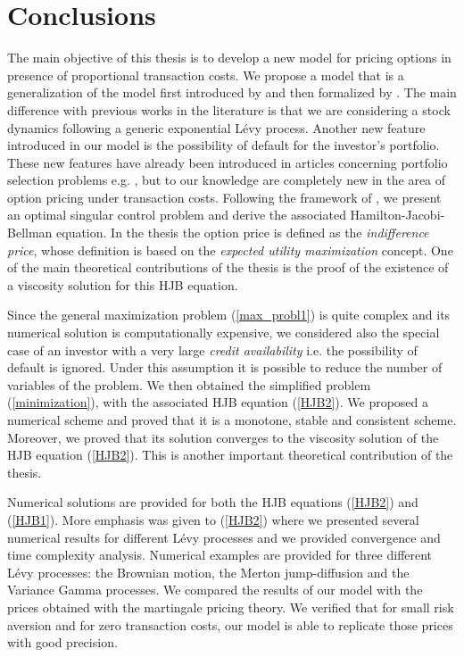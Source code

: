 
\chapter{Conclusions}\label{Conclusions}


\vspace{5em}




The main objective of this thesis is to develop a new model for pricing options in presence of proportional transaction costs.
We propose a model that is a generalization of the model first introduced by \cite{HoNe89} and then formalized by \cite{DaPaZa93}.
The main difference with previous works in the literature is that we are considering a stock dynamics following a generic exponential Lévy process.
Another new feature introduced in our model is the possibility of default for the investor's portfolio. These new features have already been introduced in articles 
concerning portfolio selection problems e.g. \cite{Kab16}, but to our knowledge are completely new in the area of option pricing under transaction costs.
Following the framework of \cite{Kab16}, we present an optimal singular control problem and derive the associated Hamilton-Jacobi-Bellman equation.
In the thesis the option price is defined as the \emph{indifference price}, whose definition is based on the \emph{expected utility maximization} concept.
One of the main theoretical contributions of the thesis is the proof of the existence of a viscosity solution 
for this HJB equation. 

Since the general maximization problem (\ref{max_probl1}) is quite complex and its numerical solution is computationally expensive,
we considered also the special case of an investor with a very large \emph{credit availability} i.e. the possibility of default is ignored.
Under this assumption it is possible to reduce the number of variables of the problem. We then obtained the simplified problem (\ref{minimization}), 
with the associated HJB equation (\ref{HJB2}).
We proposed a numerical scheme and proved that it is a monotone, stable and consistent scheme.  
Moreover, we proved that its solution converges to the viscosity solution of the
HJB equation (\ref{HJB2}). This is another important theoretical contribution of the thesis.

Numerical solutions are provided for both the HJB equations (\ref{HJB2}) and (\ref{HJB1}). 
More emphasis was given to (\ref{HJB2}) where we presented several numerical results for different Lévy processes and we provided convergence and time complexity 
analysis.
Numerical examples are provided for three different Lévy processes: the Brownian motion, the Merton jump-diffusion and the Variance Gamma processes. 
We compared the results of our model with the prices obtained with the martingale pricing theory.
We verified that for small risk aversion and for zero transaction costs, our model is able to replicate those prices with good precision.

